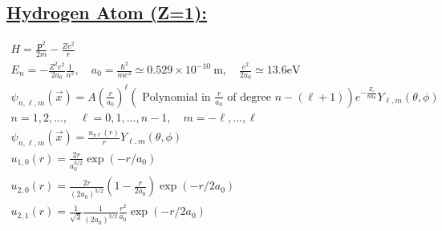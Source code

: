 \documentclass[a4paper,12pt]{article}
\begin{document}
\subsection*{\underline{Hydrogen Atom (Z=1):}}
\begin{gather}
    H=\frac{\mathbf{p}^{2}}{2 m}-\frac{Z e^{2}}{r} \\
    E_{n}=-\frac{Z^{2} e^{2}}{2 a_{0}} \frac{1}{n^{2}}, \quad a_{0}=\frac{\hbar^{2}}{m e^{2}} \simeq 0.529 \times 10^{-10} \mathrm{~m}, \quad \frac{e^{2}}{2 a_{0}} \simeq 13.6 \mathrm{eV} \\
    \psi_{n, \ell, m}(\vec{x})=A\left(\frac{r}{a_{0}}\right)^{\ell}\left(\text { Polynomial in } \frac{r}{a_{0}} \text { of degree } n-(\ell+1)\right) e^{-\frac{Z_{r}}{n a_{0}}} Y_{\ell, m}(\theta, \phi) \\
    n=1,2, \ldots, \quad \ell=0,1, \ldots, n-1, \quad m=-\ell, \ldots, \ell \\
    \psi_{n, \ell, m}(\vec{x})=\frac{u_{n \ell}(r)}{r} Y_{\ell, m}(\theta, \phi) \\
    u_{1,0}(r)=\frac{2 r}{a_{0}^{3 / 2}} \exp \left(-r / a_{0}\right) \\
    u_{2,0}(r)=\frac{2 r}{\left(2 a_{0}\right)^{3 / 2}}\left(1-\frac{r}{2 a_{0}}\right) \exp \left(-r / 2 a_{0}\right) \\
    u_{2,1}(r)=\frac{1}{\sqrt{3}} \frac{1}{\left(2 a_{0}\right)^{3 / 2}} \frac{r^{2}}{a_{0}} \exp \left(-r / 2 a_{0}\right)
\end{gather}
\end{document}
